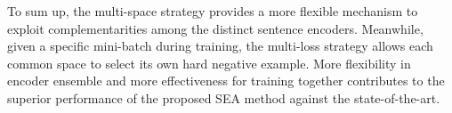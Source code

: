 To sum up, the multi-space strategy provides a more flexible mechanism to exploit complementarities among the distinct sentence encoders. Meanwhile, given a specific mini-batch during training, the multi-loss strategy allows each common space to select its own hard negative example. More flexibility in encoder ensemble and more effectiveness for training together contributes to the superior performance of the proposed SEA method against the state-of-the-art.


